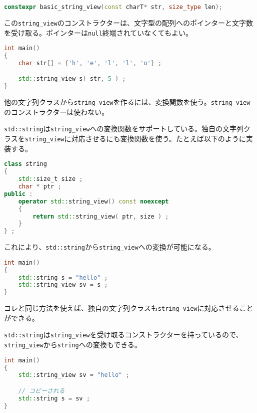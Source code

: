 %

\bgroup
\begin{lstlisting}[language=C++]
constexpr basic_string_view(const charT* str, size_type len);
\end{lstlisting}
\egroup

この\lstinline!string_view!のコンストラクターは、文字型の配列へのポインターと文字数を受け取る。ポインターは\lstinline!null!終端されていなくてもよい。

\begin{lstlisting}[language=C++]
int main()
{
    char str[] = {'h', 'e', 'l', 'l', 'o'} ;

    std::string_view s( str, 5 ) ;
}
\end{lstlisting}

%

他の文字列クラスから\lstinline!string_view!を作るには、変換関数を使う。\lstinline!string_view!のコンストラクターは使わない。

\lstinline!std::string!は\lstinline!string_view!への変換関数をサポートしている。独自の文字列クラスを\lstinline!string_view!に対応させるにも変換関数を使う。たとえば以下のように実装する。

\begin{lstlisting}[language=C++]
class string
{
    std::size_t size ;
    char * ptr ;
public :
    operator std::string_view() const noexcept
    {
        return std::string_view( ptr, size ) ;
    }
} ;
\end{lstlisting}

これにより、\lstinline!std::string!から\lstinline!string_view!への変換が可能になる。

\begin{lstlisting}[language=C++]
int main()
{
    std::string s = "hello" ;
    std::string_view sv = s ;
}
\end{lstlisting}

コレと同じ方法を使えば、独自の文字列クラスも\lstinline!string_view!に対応させることができる。

\lstinline!std::string!は\lstinline!string_view!を受け取るコンストラクターを持っているので、\lstinline!string_view!から\lstinline!string!への変換もできる。

\begin{lstlisting}[language=C++]
int main()
{
    std::string_view sv = "hello" ;

    // コピーされる
    std::string s = sv ;
}
\end{lstlisting}

